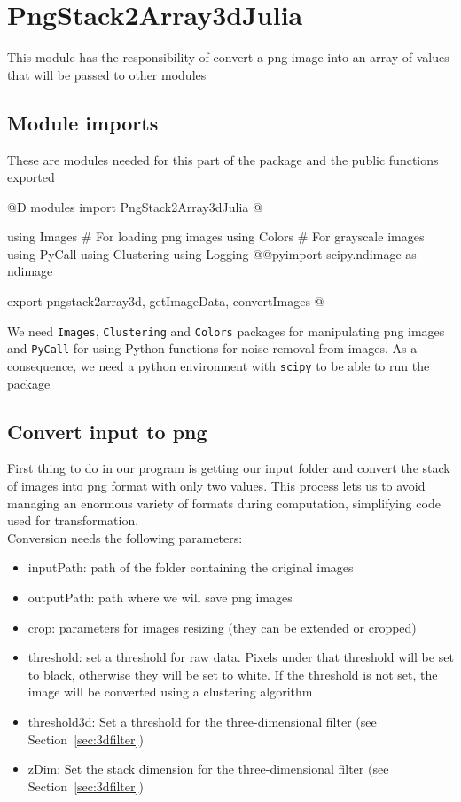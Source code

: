 \documentclass[11pt,oneside]{article}	%
\begin{document}
\section{PngStack2Array3dJulia}\label{sec:PngStack2Array3dJulia}

This module has the responsibility of convert a png image into an array of values
that will be passed to other modules

\subsection{Module imports}\label{sec:imports}
These are modules needed for this part of the package and the public functions exported

@D modules import PngStack2Array3dJulia
@{using Images # For loading png images
using Colors # For grayscale images
using PyCall
using Clustering
using Logging
@@pyimport scipy.ndimage as ndimage

export pngstack2array3d, getImageData, convertImages
@}

We need \texttt{Images}, \texttt{Clustering} and \texttt{Colors} packages for manipulating png images and \texttt{PyCall} for using Python functions for noise removal from images.
As a consequence, we need a python environment with \texttt{scipy} to be able to run the package

\subsection{Convert input to png}\label{sec:convertPNG}

First thing to do in our program is getting our input folder and convert the stack of images into png format with only two values. This process lets us to avoid managing an enormous variety of formats during computation, simplifying code used for transformation.\\

Conversion needs the following parameters:
\begin{itemize}
 \item inputPath: path of the folder containing the original images
 \item outputPath: path where we will save png images
 \item crop: parameters for images resizing (they can be extended or cropped)
 \item threshold: set a threshold for raw data. Pixels under that threshold will be set to black, otherwise they will be set to white. If the threshold is not set, the image will be converted using a clustering algorithm
 \item threshold3d: Set a threshold for the three-dimensional filter (see Section~\ref{sec:3dfilter})
 \item zDim: Set the stack dimension for the three-dimensional filter (see Section~\ref{sec:3dfilter})
\end{itemize}
\end{document}
